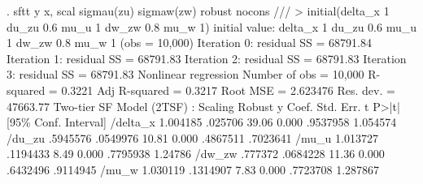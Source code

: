 . sftt y x, scal sigmau(zu) sigmaw(zw) robust nocons ///
>          initial(delta_x 1 du_zu 0.6 mu_u 1 dw_zw 0.8 mu_w 1)
initial value: delta_x 1 du_zu 0.6 mu_u 1 dw_zw 0.8 mu_w 1
(obs = 10,000)
{\smallskip}
Iteration 0:  residual SS =  68791.84
Iteration 1:  residual SS =  68791.83
Iteration 2:  residual SS =  68791.83
Iteration 3:  residual SS =  68791.83
{\smallskip}
{\smallskip}
Nonlinear regression                                Number of obs =     10,000
                                                    R-squared     =     0.3221
                                                    Adj R-squared =     0.3217
                                                    Root MSE      =   2.623476
                                                    Res. dev.     =   47663.77
{\smallskip}
Two-tier SF Model (2TSF) : Scaling
             {\VBAR}               Robust
           y {\VBAR}      Coef.   Std. Err.      t    P>|t|     [95\% Conf. Interval]
    /delta_x {\VBAR}   1.004185    .025706    39.06   0.000     .9537958    1.054574
      /du_zu {\VBAR}   .5945576   .0549976    10.81   0.000     .4867511    .7023641
       /mu_u {\VBAR}   1.013727   .1194433     8.49   0.000     .7795938     1.24786
      /dw_zw {\VBAR}    .777372   .0684228    11.36   0.000     .6432496    .9114945
       /mu_w {\VBAR}   1.030119   .1314907     7.83   0.000     .7723708    1.287867
